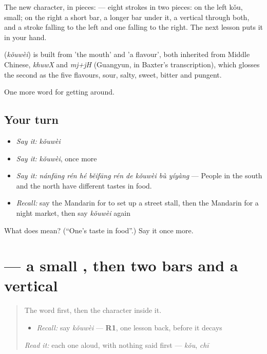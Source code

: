 The new character, in pieces:  — eight strokes in two pieces: on the left  kǒu, small; on the right a short bar, a longer bar under it, a vertical through both, and a stroke falling to the left and one falling to the right. The next lesson puts it in your hand.

\begin{cousinweb}
\textbf{} (\emph{kǒuwèi}) is built from  'the mouth' and  'a flavour', both inherited from Middle Chinese, \emph{khuwX} and \emph{mj+jH} (Guangyun, in Baxter's transcription), which glosses the second as the five flavours, sour, salty, sweet, bitter and pungent.
\end{cousinweb}

\begin{grammarlens}[title={What you've built}]
One more word for getting around.
\end{grammarlens}

\subsection*{Your turn}
\begin{itemize}
\raggedright
  \item \emph{Say it:} \emph{kǒuwèi}
  \item \emph{Say it:} \emph{kǒuwèi}, once more
  \item \emph{Say it:} \emph{nánfāng rén hé běifāng rén de kǒuwèi bù yíyàng} — People in the south and the north have different tastes in food.
  \item \emph{Recall:} say the Mandarin for to set up a street stall, then the Mandarin for a night market, then say \emph{kǒuwèi} again
\end{itemize}

\begin{tcolorbox}[breakable,colback=teal!4,colframe=teal!35!black,title={Before you move on}]
What does  mean? (\textquotedblleft{}One's taste in food\textquotedblright{}.) Say it once more.
\end{tcolorbox}
\section[\texorpdfstring{\zh{味} (wèi)}{味 (wèi)}]{ — a small , then two bars and a vertical}

\label{lesson:ZH-W449-wei-taste}



\begin{quote}
The word first, then the character inside it.

\begin{itemize}
\raggedright
  \item \emph{Recall:} say \emph{kǒuwèi} — \textbf{R1}, one lesson back, before it decays
\end{itemize}

\begin{quote}
 
\end{quote}

\emph{Read it:} each one aloud, with nothing said first — \emph{kǒu}, \emph{chī}
\end{quote}

